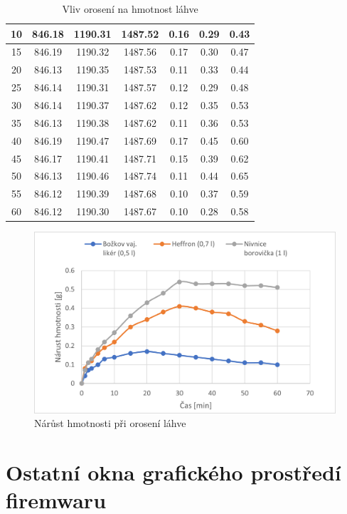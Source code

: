 \begin{table}[H]
\begin{tabular}{|c|c|c|c||c|c|c|}
    10 & 846.18 & 1190.31 & 1487.52 & 0.16 & 0.29 & 0.43 \\ \hline
    15 & 846.19 & 1190.32 & 1487.56 & 0.17 & 0.30 & 0.47 \\ \hline
    20 & 846.13 & 1190.35 & 1487.53 & 0.11 & 0.33 & 0.44 \\ \hline
    25 & 846.14 & 1190.31 & 1487.57 & 0.12 & 0.29 & 0.48 \\ \hline
    30 & 846.14 & 1190.37 & 1487.62 & 0.12 & 0.35 & 0.53 \\ \hline
    35 & 846.13 & 1190.38 & 1487.62 & 0.11 & 0.36 & 0.53 \\ \hline
    40 & 846.19 & 1190.47 & 1487.69 & 0.17 & 0.45 & 0.60 \\ \hline
    45 & 846.17 & 1190.41 & 1487.71 & 0.15 & 0.39 & 0.62 \\ \hline
    50 & 846.13 & 1190.46 & 1487.74 & 0.11 & 0.44 & 0.65 \\ \hline
    55 & 846.12 & 1190.39 & 1487.68 & 0.10 & 0.37 & 0.59 \\ \hline
    60 & 846.12 & 1190.30 & 1487.67 & 0.10 & 0.28 & 0.58 \\ \hline
    \end{tabular}
    \caption{Vliv orosení na hmotnost láhve}
    \label{tab:measurement_data}
\end{table}

\begin{figure}[H]
    \begin{center}
        \includegraphics[scale=1.2]{obrazky/orosení.png}
    \end{center}
    \caption{Nárůst hmotnosti při orosení láhve}
\end{figure}

\chapter{Ostatní okna grafického prostředí firemwaru}

